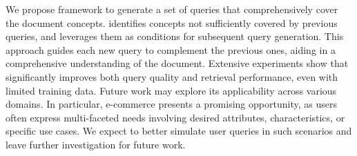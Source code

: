 We propose \proposed framework to generate a set of queries that comprehensively cover the document concepts.
\proposed identifies concepts not sufficiently covered by previous queries, and leverages them as conditions for subsequent query generation.
This approach guides each new query to complement the previous ones, aiding in a comprehensive understanding of the document.
Extensive experiments show that \proposed significantly improves both query quality and retrieval performance, even with limited training data. 
Future work may explore its applicability across various domains. 
In particular, e-commerce \cite{SSCDR, DERRD, MvFS} presents a promising opportunity, as users often express multi-faceted needs involving desired attributes, characteristics, or specific use cases. 
We expect \proposed to better simulate user queries in such scenarios and leave further investigation for future work.